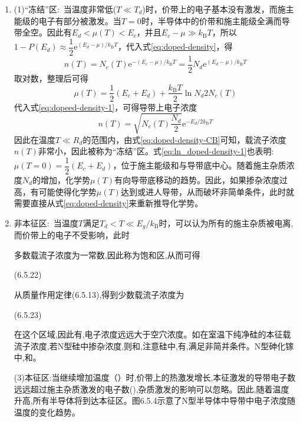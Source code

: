 \begin{enumerate}
	\item 
		(1)``冻结''区:~当温度非常低($T\ll T_d$)时，价带上的电子基本没有激发，而施主能级的电子有部分被激发。当$T=0$时，半导体中的价带和施主能级全满而导带全空。因此有$E_d<\mu(T)<E_c$，并且$E_c-\mu\gg k_{\mathrm{B}}T$，所以$1-P(E_d)\approx\dfrac12\mathrm{e}^{(E_d-\mu)/k_{\mathrm{B}}T}$，代入式\eqref{eq:doped-density}，得
		\begin{equation}
			n(T)=N_c(T)\mathrm{e}^{-(E_c-\mu)/k_{\mathrm{B}}T}=\dfrac12N_d\mathrm{e}^{(E_d-\mu)/k_{\mathrm{B}}T}
			\label{eq:doped-density-1}
		\end{equation}
取对数，整理后可得
\begin{equation}
	\mu(T)=\dfrac12(E_c+E_d)+\dfrac{k_{\mathrm{B}}T}2\ln{N_d}{2N_c(T)}
	\label{eq:ln_doped-density-1}
\end{equation}
代入式\eqref{eq:dopeed-density-1}，可得导带上电子浓度
\begin{equation}
	n(T)=\sqrt{N_c(T)\dfrac{N_d}2}\mathrm{e}^{-E_d/2k_{\mathrm{B}}T}
	\label{eq:doped-density-CB}
\end{equation}
因此在温度$T\ll R_d$的范围内，由式\eqref{eq:doped-density-CB}可知，载流子浓度$n(T)$非常小，因此被称为``冻结''区。式\eqref{eq:ln_doped-density-1}也表明:~$\mu(T=0)=\dfrac12(E_c+E_d)$，位于施主能级和与导带底中心。随着施主杂质浓度$N_d$的增加，化学势$\mu(T)$有向导带底移动的趋势。因此，如果掺杂浓度过高，有可能使得化学势$\mu(T)$达到或进人导带，从而破坏非简单条件，此时就需要直接从式\eqref{eq:doped-density}来重新推导化学势。

\item 非本征区:~当温度$T$满足$T_d<T\ll E_g/k_{\mathrm{B}}$时，可以认为所有的施主杂质被电离,而价带上的电子不受影响，此时


多数载流子浓度为一常数,因此称为饱和区,从而可得

	(6.5.22)

从质量作用定律(6.5.13),得到少数载流子浓度为

	(6.5.23)

在这个区域,因此有,电子浓度远远大于空穴浓度。如在室温下纯净硅的本征载流子浓度,若N型硅中掺杂浓度,则和,注意硅中,有,满足非简并条件。N型砷化镓中,和。

(3)本征区:当继续增加温度（）时,价带上的热激发增长,本征激发的导带电子数远远超过施主杂质激发的电子数(),杂质激发的影响可以忽略。因此,随着温度升高,所有半导体将到达本征区。图6.5.4示意了N型半导体中导带中电子浓度随温度的变化趋势。

\end{enumerate}


